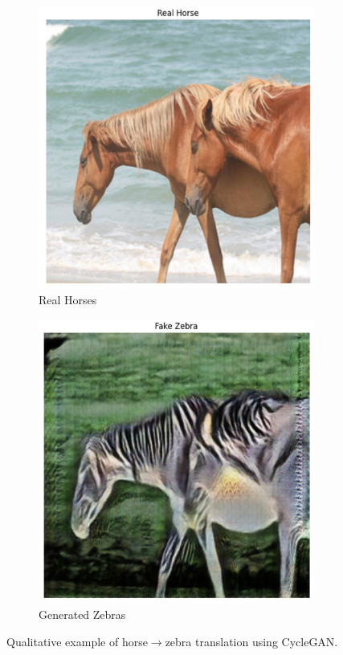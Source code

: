 \documentclass[11pt,a4paper]{article}
\begin{document}
\begin{figure}[H]
    \centering
    \begin{subfigure}{0.48\textwidth}
        \includegraphics[width=\linewidth]{real_horses.png}
        \caption{Real Horses}
    \end{subfigure}\hfill
    \begin{subfigure}{0.48\textwidth}
        \includegraphics[width=\linewidth]{fake_zebras.png}
        \caption{Generated Zebras}
    \end{subfigure}
    \caption{Qualitative example of horse$\rightarrow$zebra translation using CycleGAN.}
    \label{fig:h2z}
\end{figure}
\end{document}
